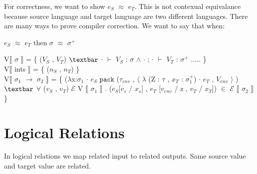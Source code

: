 \documentclass{article}
\begin{document}
For correctness, we want to show $e_S$ $\approx$ $e_T$. This is not contexual equivalance because source language and target language are two different languages.
There are many ways to prove compiler correction. We want to say that when:
\begin{center}
 $e_S$ $\approx$ $e_T$ then $\sigma$ $\approx$ $\sigma^+$
\end{center}
V$\llbracket$ $\sigma$ $\rrbracket$  = \{  ($V_S$ , $V_T$) $\textbar$ $\cdot$ $\vdash$ $V_{S}$ : $\sigma$ $\wedge$ $\cdot$ ; $\cdot$ $\vdash$ $V_{T}$ : $\sigma^+$ ..... \} \\
V$\llbracket$ ints $\rrbracket$ = \{ ($n_S$ , $n_T$) \} \\
V$\llbracket$ $\sigma_1$ $\rightarrow$ $\sigma_2$ $\rrbracket$ = \{ ($\lambda$x:$\sigma_1$ $\cdot$ $e_S$ $\texttt{pack}$ ($\tau_{env}$ , $\langle$ $\lambda$ (Z : $\tau$ , $x_{T}$ : $\sigma_1^+$) $\cdot$ $e_T$ , $V_{env}$ $\rangle$ ) $\textbar$ $\forall$ ($v_S$ , $v_T$) $\mathcal{E}$ V $\llbracket$ $\sigma_1$ $\rrbracket$ . ($e_S$[$v_s$ / $x_s$] , $e_T$ [$v_{env}$ / z , $v_T$ / $x_T$]) $\in$ $\mathcal{E}$ $\llbracket$ $\sigma_2$ $\rrbracket$ \}

\section{Logical Relations}

In logical relations we map related input to related outputs. Same source value and target value are related.
\end{document}
